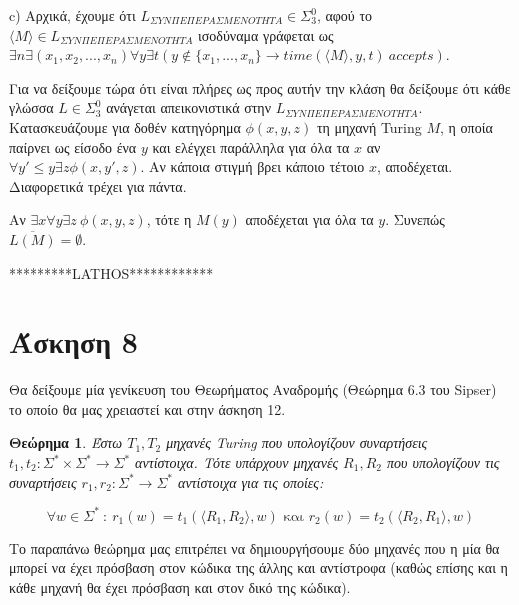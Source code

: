 \documentclass[a4paper, oneside, 11pt]{article}
\newtheorem{thm}{Θεώρημα}
\theoremstyle{definition}
\begin{document}
c) Αρχικά, έχουμε ότι $L_{\Sigma YN\Pi E\Pi EPA\Sigma MENOTHTA}\in \Sigma_3^0$, αφού το $\langle M\rangle \in L_{\Sigma YN\Pi E\Pi EPA\Sigma MENOTHTA}$ ισοδύναμα γράφεται
ως $\exists n \exists (x_1, x_2, ..., x_n)\forall y\exists t (y\notin \{x_1, ..., x_n\} \rightarrow time(\langle M\rangle, y, t)\ accepts)$.

Για να δείξουμε τώρα ότι είναι πλήρες ως προς αυτήν την κλάση θα δείξουμε ότι κάθε γλώσσα $L\in \Sigma_3^0$ ανάγεται απεικονιστικά στην $L_{\Sigma YN\Pi E\Pi EPA\Sigma MENOTHTA}$.
Κατασκευάζουμε για δοθέν κατηγόρημα $\phi(x,y,z)$ τη μηχανή Turing $M$, η οποία παίρνει ως είσοδο ένα $y$ και ελέγχει παράλληλα για όλα τα $x$ αν 
$\forall y'\leq y\exists z\phi(x,y',z)$.
Αν κάποια στιγμή βρει κάποιο τέτοιο $x$, αποδέχεται. Διαφορετικά τρέχει για πάντα.

Αν $\exists x\forall y\exists z\ \phi(x,y,z)$, τότε η $M(y)$ αποδέχεται για όλα τα $y$. Συνεπώς $\overline{L(M)}=\emptyset$.


*********LATHOS************

\section*{Άσκηση 8}

Θα δείξουμε μία γενίκευση του Θεωρήματος Αναδρομής (Θεώρημα 6.3 του Sipser) το
οποίο θα μας χρειαστεί και στην άσκηση 12.

\begin{thm}
\label{rec_thm}
Έστω $T_1, T_2$ μηχανές Turing που υπολογίζουν συναρτήσεις $t_1, t_2 : \Sigma^* \times
\Sigma^* \rightarrow \Sigma^*$ αντίστοιχα. Τότε υπάρχουν μηχανές $R_1, R_2$ που
υπολογίζουν τις συναρτήσεις
$r_1, r_2 : \Sigma^* \rightarrow \Sigma^*$ αντίστοιχα για τις οποίες:

\begin{equation*}
   \forall w \in \Sigma^*\ :\ r_1(w) = t_1(\langle R_1, R_2 \rangle, w)
   \text{ και } r_2(w) = t_2(\langle R_2, R_1 \rangle, w)
\end{equation*}
\end{thm}

Το παραπάνω θεώρημα μας επιτρέπει να δημιουργήσουμε δύο μηχανές που η μία θα
μπορεί να έχει πρόσβαση στον κώδικα της άλλης και αντίστροφα (καθώς επίσης και η
κάθε μηχανή θα έχει πρόσβαση και στον δικό της κώδικα).
\end{document}
